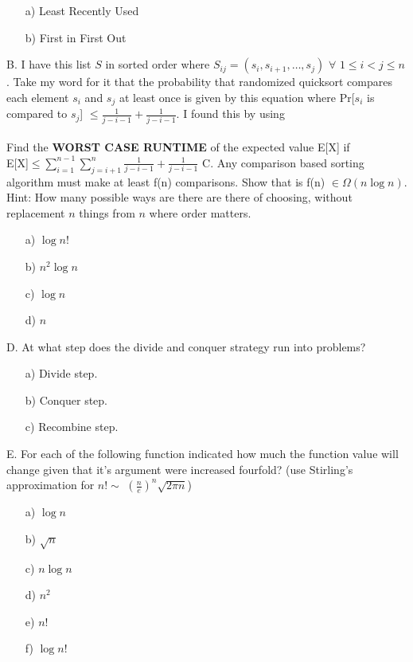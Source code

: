 \documentclass[12pt]{article}
\begin{document}
\begin{enumerate}
    \item[a)]Least Recently Used
    \item[b)]First in First Out
\end{enumerate}
\newpage
\noindent B. I have this list $S$ in sorted order where $S_{ij} = (s_i,s_{i+1},\dots,s_j)$ $\forall$ $1 \leq i < j \leq n$. Take my word for it that the probability that randomized quicksort compares each element $s_i$ and $s_j$ at least once is given by this equation where Pr[$s_i$ is compared to $s_j$] $\leq \frac{1}{j-i-1}+\frac{1}{j-i-1}$. I found this by using \\\\
Find the \textbf{WORST CASE RUNTIME} of the expected value E[X] if\\
E[X]$\leq \sum\limits_{i=1}^{n-1}{\sum\limits_{j=i+1}^{n}{\frac{1}{j-i-1}+\frac{1}{j-i-1}}}$
\newpage
\noindent C. Any comparison based sorting algorithm must make at least f(n) comparisons. Show that is f(n) $\in \Omega(n\log{n})$. Hint: How many possible ways are there are there of choosing, without replacement $n$ things from $n$ where order matters.
\begin{enumerate}
    \item[a)]$\log{n!}$
    \item[b)]$n^2\log{n}$
    \item[c)]$\log{n}$
    \item[d)]$n$
\end{enumerate}
D. At what step does the divide and conquer strategy run into problems?
\begin{enumerate}
    \item[a)]Divide step.
    \item[b)]Conquer step.
    \item[c)]Recombine step.
\end{enumerate}
E. For each of the following function indicated how much the function value will change given that it's argument were increased fourfold? (use Stirling's approximation for $n! \sim$ $(\frac{n}{e})^n\sqrt{2\pi n}$)
\begin{enumerate}
    \item[a)]$\log{n}$
    \item[b)]$\sqrt{n}$
    \item[c)]$n\log{n}$
    \item[d)]$n^2$
    \item[e)]$n!$
    \item[f)]$\log{n!}$
\end{enumerate}
\end{document}

